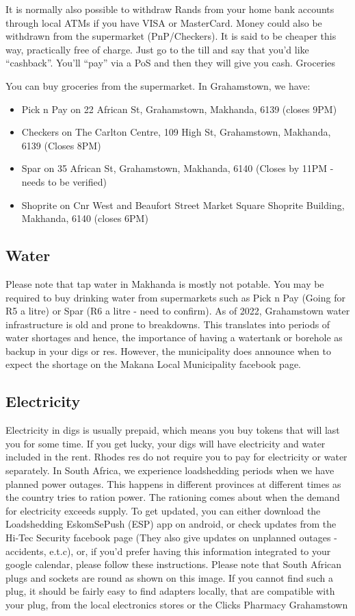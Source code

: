 It is normally also possible to withdraw Rands from your home bank accounts through local ATMs if you have VISA or MasterCard. Money could also be withdrawn from the supermarket (PnP/Checkers). It is said to be cheaper this way, practically free of charge. Just go to the till and say that you’d like “cashback”. You’ll “pay” via a PoS and then they will give you cash.
Groceries

You can buy groceries from the supermarket. In Grahamstown, we have:

\begin{itemize}
    \item Pick n Pay on 22 African St, Grahamstown, Makhanda, 6139 (closes 9PM)
    \item Checkers on The Carlton Centre, 109 High St, Grahamstown, Makhanda, 6139 (Closes 8PM)
    \item Spar on 35 African St, Grahamstown, Makhanda, 6140 (Closes by 11PM - needs to be verified)
    \item Shoprite on Cnr West and Beaufort Street Market Square Shoprite Building, Makhanda, 6140 (closes 6PM)
\end{itemize}

\subsection{Water}
Please note that tap water in Makhanda is mostly not potable. You may be required to buy drinking water from supermarkets such as Pick n Pay (Going for R5 a litre) or Spar (R6 a litre - need to confirm).  As of 2022, Grahamstown water infrastructure is old and prone to breakdowns. This translates into periods of water shortages and hence, the importance of having a watertank or borehole as backup in your digs or res. However, the municipality does announce when to expect the shortage on the Makana Local Municipality facebook page. 

\subsection{Electricity}
Electricity in digs is usually prepaid, which means you buy tokens that will last you for some time. If you get lucky, your digs will have electricity and water included in the rent. Rhodes res do not require you to pay for electricity or water separately.  
In South Africa, we experience loadshedding periods when we have planned power outages. This happens in different provinces at different times as the country tries to ration power. The rationing comes about when the demand for electricity exceeds supply. To get updated, you can either download the Loadshedding EskomSePush (ESP) app on android, or check updates from the Hi-Tec Security facebook page (They also give updates on unplanned outages - accidents, e.t.c), or, if you’d prefer having this information integrated to your google calendar, please follow these instructions. 
Please note that South African plugs and sockets are round as shown on this image. If you cannot find such a plug, it should be fairly easy to find adapters locally, that are compatible with your plug, from the local electronics stores or the Clicks Pharmacy Grahamstown   

